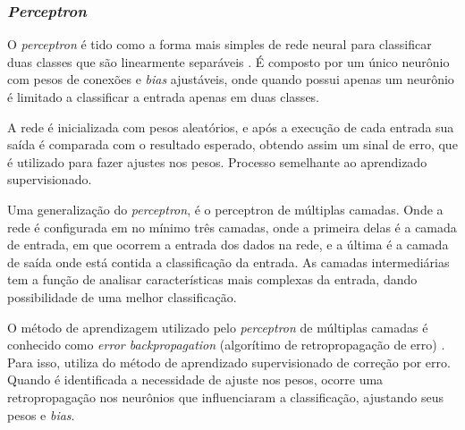 \subsubsection{\textit{Perceptron}}
O \textit{perceptron} é tido como a forma mais simples de rede neural para classificar duas classes que são linearmente separáveis \cite{haykin2001}. É composto por um único neurônio com pesos de conexões e \textit{bias} ajustáveis, onde quando possui apenas um neurônio é limitado a classificar a entrada apenas em duas classes. 
\par A rede é inicializada com pesos aleatórios, e após a execução de cada entrada sua saída é comparada com o resultado esperado, obtendo assim um sinal de erro, que é utilizado para fazer ajustes nos pesos. Processo semelhante ao aprendizado supervisionado.
\par Uma generalização do \textit{perceptron}, é o perceptron de múltiplas camadas. Onde a rede é configurada em no mínimo três camadas, onde a primeira delas é a camada de entrada, em que ocorrem a entrada dos dados na rede, e a última é a camada de saída onde está contida a classificação da entrada. As camadas intermediárias tem a função de analisar características mais complexas da entrada, dando possibilidade de uma melhor classificação.
\par O método de aprendizagem utilizado pelo \textit{perceptron} de múltiplas camadas é conhecido como \textit{error backpropagation} (algorítimo de retropropagação de erro) \cite{haykin2001}. Para isso, utiliza do método de aprendizado supervisionado de correção por erro. Quando é identificada a necessidade de ajuste nos pesos, ocorre uma 
retropropagação nos neurônios que influenciaram a classificação, ajustando seus pesos 
e \textit{bias}.
